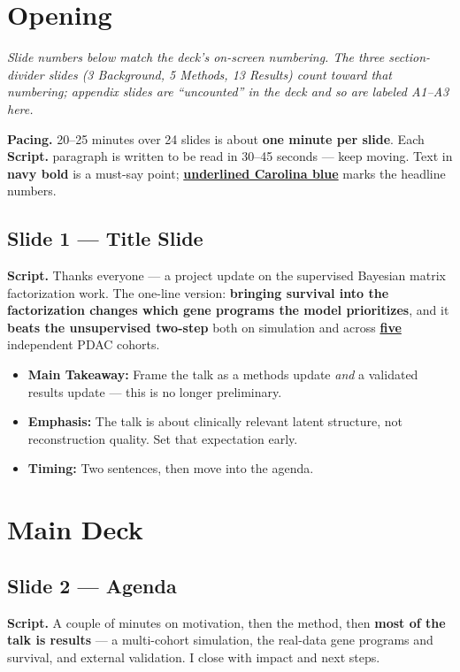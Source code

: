 \documentclass[11pt]{article}
\newcommand{\scriptlabel}{\textbf{Script. }}
\newcommand{\sectionlabel}[1]{\textbf{#1}}
\newcommand{\key}[1]{\textcolor{keyblue}{\textbf{#1}}}        %
\newcommand{\num}[1]{\textcolor{keycar}{\textbf{\uline{#1}}}} %
\begin{document}
\section*{Opening}

\noindent\emph{Slide numbers below match the deck's on-screen numbering. The three section-divider
slides (3 Background, 5 Methods, 13 Results) count toward that numbering; appendix slides are
``uncounted'' in the deck and so are labeled A1--A3 here.}

\noindent\textbf{Pacing.} 20--25 minutes over 24 slides is about \key{one minute per slide}. Each
\scriptlabel paragraph is written to be read in 30--45 seconds --- keep moving. Text in
\key{navy bold} is a must-say point; \num{underlined Carolina blue} marks the headline numbers.

\subsection*{Slide 1 --- Title Slide}
\scriptlabel Thanks everyone --- a project update on the supervised Bayesian matrix factorization
work. The one-line version: \key{bringing survival into the factorization changes which gene
programs the model prioritizes}, and it \key{beats the unsupervised two-step} both on simulation and
across \num{five} independent PDAC cohorts.

\begin{itemize}
\item \sectionlabel{Main Takeaway:} Frame the talk as a methods update \emph{and} a validated
results update --- this is no longer preliminary.
\item \sectionlabel{Emphasis:} The talk is about clinically relevant latent structure, not
reconstruction quality. Set that expectation early.
\item \sectionlabel{Timing:} Two sentences, then move into the agenda.
\end{itemize}

\section*{Main Deck}

\subsection*{Slide 2 --- Agenda}
\scriptlabel A couple of minutes on motivation, then the method, then \key{most of the talk is
results} --- a multi-cohort simulation, the real-data gene programs and survival, and external
validation. I close with impact and next steps.
\end{document}
